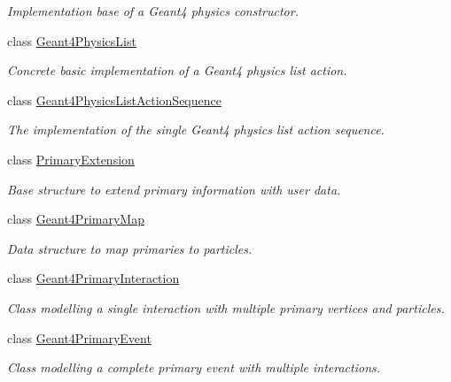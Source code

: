 \begin{DoxyCompactItemize}
\begin{DoxyCompactList}\small\item\em Implementation base of a Geant4 physics constructor. \item\end{DoxyCompactList}\item 
class \hyperlink{class_d_d4hep_1_1_simulation_1_1_geant4_physics_list}{Geant4PhysicsList}
\begin{DoxyCompactList}\small\item\em Concrete basic implementation of a Geant4 physics list action. \item\end{DoxyCompactList}\item 
class \hyperlink{class_d_d4hep_1_1_simulation_1_1_geant4_physics_list_action_sequence}{Geant4PhysicsListActionSequence}
\begin{DoxyCompactList}\small\item\em The implementation of the single Geant4 physics list action sequence. \item\end{DoxyCompactList}\item 
class \hyperlink{class_d_d4hep_1_1_simulation_1_1_primary_extension}{PrimaryExtension}
\begin{DoxyCompactList}\small\item\em Base structure to extend primary information with user data. \item\end{DoxyCompactList}\item 
class \hyperlink{class_d_d4hep_1_1_simulation_1_1_geant4_primary_map}{Geant4PrimaryMap}
\begin{DoxyCompactList}\small\item\em Data structure to map primaries to particles. \item\end{DoxyCompactList}\item 
class \hyperlink{class_d_d4hep_1_1_simulation_1_1_geant4_primary_interaction}{Geant4PrimaryInteraction}
\begin{DoxyCompactList}\small\item\em Class modelling a single interaction with multiple primary vertices and particles. \item\end{DoxyCompactList}\item 
class \hyperlink{class_d_d4hep_1_1_simulation_1_1_geant4_primary_event}{Geant4PrimaryEvent}
\begin{DoxyCompactList}\small\item\em Class modelling a complete primary event with multiple interactions. \item\end{DoxyCompactList}\item 

\end{DoxyCompactItemize}
